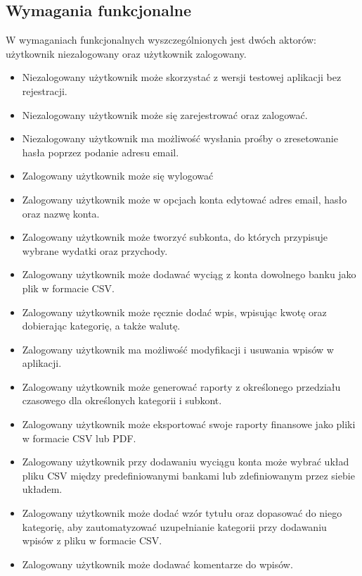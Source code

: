 \documentclass{article}
\begin{document}
	\subsection{Wymagania funkcjonalne}
	W wymaganiach funkcjonalnych wyszczególnionych jest dwóch aktorów: użytkownik niezalogowany oraz użytkownik zalogowany.
	\begin{itemize}
		\item Niezalogowany użytkownik może skorzystać z wersji testowej aplikacji bez rejestracji.
		\item Niezalogowany użytkownik może się zarejestrować oraz zalogować.
		\item Niezalogowany użytkownik ma możliwość wysłania prośby o zresetowanie hasła poprzez podanie adresu email.
		\item Zalogowany użytkownik może się wylogować
		\item Zalogowany użytkownik może w opcjach konta edytować adres email, hasło oraz nazwę konta.
		\item Zalogowany użytkownik może tworzyć subkonta, do których przypisuje wybrane wydatki oraz przychody.
		\item Zalogowany użytkownik może dodawać wyciąg z konta dowolnego banku jako plik w formacie CSV.
		\item Zalogowany użytkownik może ręcznie dodać wpis, wpisując kwotę oraz dobierając kategorię, a także walutę.
		\item Zalogowany użytkownik ma możliwość modyfikacji i usuwania wpisów w aplikacji.
		\item Zalogowany użytkownik może generować raporty z określonego przedziału czasowego dla określonych kategorii i subkont.
		\item Zalogowany użytkownik może eksportować swoje raporty finansowe jako pliki w formacie CSV lub PDF.
		\item Zalogowany użytkownik przy dodawaniu wyciągu konta może wybrać układ pliku CSV między predefiniowanymi bankami lub zdefiniowanym przez siebie układem.
		\item Zalogowany użytkownik może dodać wzór tytułu oraz dopasować do niego kategorię, aby zautomatyzować uzupełnianie kategorii przy dodawaniu wpisów z pliku w formacie CSV.
		\item Zalogowany użytkownik może dodawać komentarze do wpisów.
		
	\end{itemize}
\end{document}
